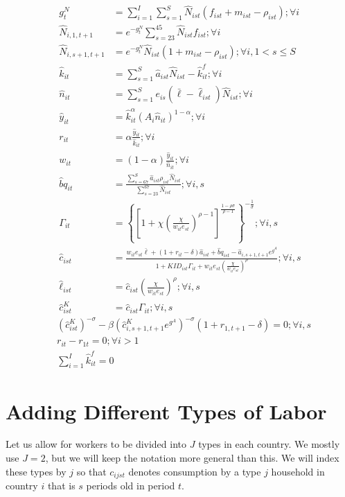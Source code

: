 \documentclass[letterpaper,12pt]{article}
\theoremstyle{definition}
\numberwithin{equation}{section}
\begin{document}
\begin{spacing}{1.5}
	\begin{align}
		g^N_t & = \sum_{i=1}^I \sum_{s=1}^S \hat N_{ist} (f_{ist}+m_{ist}-\rho_{ist}) ; \forall i \label{eq_4gNdef}\\
		\hat N_{i,1,t+1} & = e^{-g^N_t}\sum_{s=23}^{45} \hat N_{ist} f_{ist} ; \forall i\\
		\hat N_{i,s+1,t+1} & = e^{-g^N_t}\hat N_{ist} (1+m_{ist}-\rho_{ist}); \forall i, 1<s\le S \label{eq_4pop2} \\
		\hat k_{it} & = \sum_{s=1}^S \hat a_{ist} \hat N_{ist} - \hat k_{it}^f; \forall i \\
		\hat n_{it} & = \sum_{s=1}^S e_{is} (\bar \ell - \hat \ell_{ist}) \hat N_{ist}; \forall i \\
		\hat y_{it} & = \hat k_{it}^\alpha \left( A_{i} \hat n_{it} \right)^{1-\alpha} ; \forall i \\
		r_{it} & = \alpha \frac{\hat y_{it}}{\hat k_{it}}; \forall i \\
		w_{it} & = (1-\alpha) \frac{\hat y_{it}}{\hat n_{it}}; \forall i \\
		\hat bq_{it} & = \frac{\sum_{s=67}^S \hat a_{ist} \rho_{ist} \hat N_{ist}}{\sum_{s=23}^{67} \hat N_{ist}} ; \forall i,s \\
		\Gamma_{it} & = \left\{ \left[1 + \chi \left(\frac{\chi}{w_{it} e_{st}}\right)^{\rho-1}\right]^{\tfrac{1-\rho \sigma}{\rho-1}}  \right\}^{-\tfrac{1}{\sigma}}; \forall i,s \\
    	\hat c_{ist} & = \frac{w_{it} e_{st} \bar \ell + (1+r_{it}-\delta)\hat a_{ist} +\hat bq_{ist} - \hat a_{i,s+1,t+1} e^{g^A}} {1 + KID_{ist}\Gamma_{it} +w_{it}e_{st} \left(\tfrac{\chi}{w_{it}e_{st}}\right)^\rho}; \forall i,s \\
		\hat \ell_{ist} & = \hat c_{ist} \left(\frac{\chi}{w_{it}e_{st}}\right)^\rho ; \forall i,s \\
		\hat c^K_{ist} & = \hat c_{ist} \Gamma_{it}; \forall i,s
	\end{align}
	\begin{align}
		& \left({\hat c^K_{ist}}\right)^{-\sigma} - \beta \left(\hat c^K_{i,s+1,t+1} e^{g^A}\right)^{-\sigma}(1+r_{1,t+1}-\delta) = 0; \forall i,s \\
		& r_{it} - r_{1t} = 0; \forall i>1 \\
		& \sum_{i=1}^I \hat k^f_{it} = 0
	\end{align}


\newpage
\section{Adding Different Types of Labor}
	Let us allow for workers to be divided into $J$ types in each country.  We mostly use $J=2$, but we will keep the notation more general than this.  We will index these types by $j$ so that $c_{ijst}$ denotes consumption by a type $j$ household in country $i$ that is $s$ periods old in period $t$.


\end{spacing}
\end{document}
